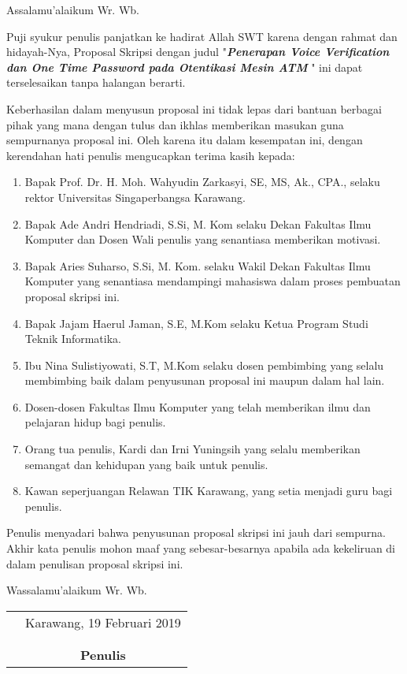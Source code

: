 \documentclass[skripsi]{skripsifasilkom}
\begin{document}
\begin{katapengantar}
	\noindent
	Assalamu'alaikum Wr. Wb.
	
	Puji syukur penulis panjatkan ke hadirat Allah SWT karena dengan rahmat dan hidayah-Nya, Proposal Skripsi dengan judul "\textit{\textbf{Penerapan Voice Verification dan One Time Password pada Otentikasi Mesin ATM }}" ini dapat terselesaikan tanpa halangan berarti.
	
	Keberhasilan dalam menyusun proposal ini tidak lepas dari bantuan berbagai pihak yang mana dengan tulus dan ikhlas memberikan masukan guna sempurnanya proposal ini. Oleh karena itu dalam kesempatan ini, dengan kerendahan hati penulis mengucapkan terima kasih kepada:
	
	\begin{enumerate}
		\item Bapak Prof. Dr. H. Moh. Wahyudin Zarkasyi, SE, MS, Ak., CPA., selaku rektor Universitas Singaperbangsa Karawang.
		\item Bapak Ade Andri Hendriadi, S.Si, M. Kom selaku Dekan Fakultas Ilmu Komputer dan Dosen Wali penulis yang senantiasa memberikan motivasi.
		\item Bapak Aries Suharso, S.Si, M. Kom. selaku Wakil Dekan Fakultas Ilmu Komputer yang senantiasa mendampingi mahasiswa dalam proses pembuatan proposal skripsi ini.
		\item Bapak Jajam Haerul Jaman, S.E, M.Kom selaku Ketua Program Studi Teknik Informatika.
		\item Ibu Nina Sulistiyowati, S.T, M.Kom selaku dosen pembimbing yang selalu membimbing baik dalam penyusunan proposal ini maupun dalam hal lain.
		\item Dosen-dosen Fakultas Ilmu Komputer yang telah memberikan ilmu dan pelajaran hidup bagi penulis.
		\item Orang tua penulis, Kardi dan Irni Yuningsih yang selalu memberikan semangat dan kehidupan yang baik untuk penulis.
		\item Kawan seperjuangan Relawan TIK Karawang, yang setia menjadi guru bagi penulis.
	\end{enumerate}
	Penulis menyadari bahwa penyusunan proposal skripsi ini jauh dari sempurna. Akhir kata penulis mohon maaf yang sebesar-besarnya apabila ada kekeliruan di dalam penulisan proposal skripsi ini.

\begin{flushleft}
		Wassalamu'alaikum Wr. Wb.\\
\end{flushleft}
	\begin{tabular}{p{7.5cm}c}
		 & Karawang, 19 Februari 2019\\
		 &                           \\
		 &                           \\
		 &     \textbf{Penulis}
	\end{tabular} 
\end{katapengantar}	
	
\end{document}
